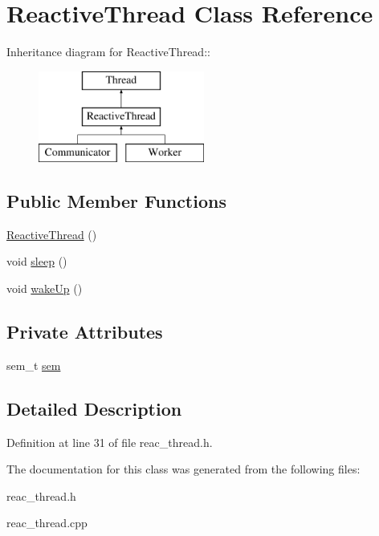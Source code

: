 \hypertarget{classReactiveThread}{
\section{Reactive\-Thread Class Reference}
\label{classReactiveThread}
}
Inheritance diagram for Reactive\-Thread::\begin{figure}[H]
\begin{center}
\leavevmode
\includegraphics[height=3cm]{classReactiveThread}
\end{center}
\end{figure}
\subsection*{Public Member Functions}
\begin{CompactItemize}
\item 
\hypertarget{classReactiveThread_77381649429941c99a3e3d568113d6cf}{
\hyperlink{classReactiveThread_77381649429941c99a3e3d568113d6cf}{Reactive\-Thread} ()}
\label{classReactiveThread_77381649429941c99a3e3d568113d6cf}

\item 
\hypertarget{classReactiveThread_8263c2a32d8c99a49a05f1a7717d4262}{
void \hyperlink{classReactiveThread_8263c2a32d8c99a49a05f1a7717d4262}{sleep} ()}
\label{classReactiveThread_8263c2a32d8c99a49a05f1a7717d4262}

\item 
\hypertarget{classReactiveThread_a724a54575de10f09cc03ab7aa4e59ce}{
void \hyperlink{classReactiveThread_a724a54575de10f09cc03ab7aa4e59ce}{wake\-Up} ()}
\label{classReactiveThread_a724a54575de10f09cc03ab7aa4e59ce}

\end{CompactItemize}
\subsection*{Private Attributes}
\begin{CompactItemize}
\item 
\hypertarget{classReactiveThread_915e5a42dc8cb1bcf6738d5fe883a4e7}{
sem\_\-t \hyperlink{classReactiveThread_915e5a42dc8cb1bcf6738d5fe883a4e7}{sem}}
\label{classReactiveThread_915e5a42dc8cb1bcf6738d5fe883a4e7}

\end{CompactItemize}


\subsection{Detailed Description}




Definition at line 31 of file reac\_\-thread.h.

The documentation for this class was generated from the following files:\begin{CompactItemize}
\item 
reac\_\-thread.h\item 
reac\_\-thread.cpp\end{CompactItemize}
